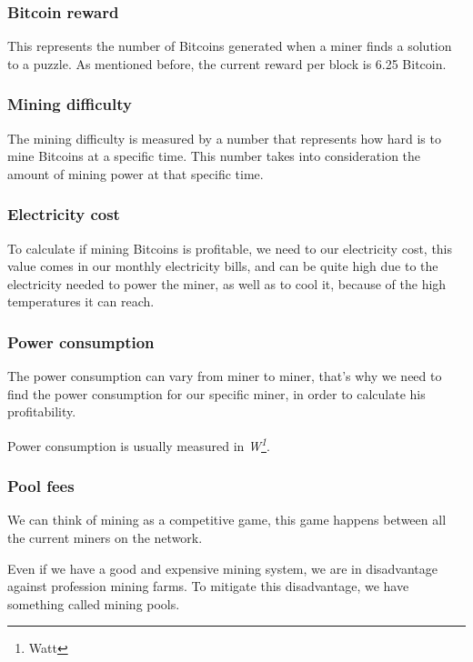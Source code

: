 \documentclass{article}
\begin{document}
 \subsubsection{Bitcoin reward}
 
 This represents the number of Bitcoins generated when a miner finds a solution to a puzzle. As mentioned before, the current reward per block is 6.25 Bitcoin.
 
 \subsubsection{Mining difficulty}
 
 The mining difficulty is measured by a number that represents how hard is to mine Bitcoins at a specific time. This number takes into consideration the amount of mining power at that specific time.
 
 \subsubsection{Electricity cost}
 
 To calculate if mining Bitcoins is profitable, we need to our electricity cost, this value comes in our monthly electricity bills, and can be quite high due to the electricity needed to power the miner, as well as to cool it, because of the high temperatures it can reach.
 
 \subsubsection{Power consumption}
 
 The power consumption can vary from miner to miner, that's why we need to find the power consumption for our specific miner, in order to calculate his profitability.  
 
 Power consumption is usually measured in \textit{W\footnote{Watt}}.
 
 \subsubsection{Pool fees}
 
 We can think of mining as a competitive game, this game happens between all the current miners on the network. 
 
 Even if we have a good and expensive mining system, we are in disadvantage against profession mining farms. To mitigate this disadvantage, we have something called mining pools.
 
\end{document}

